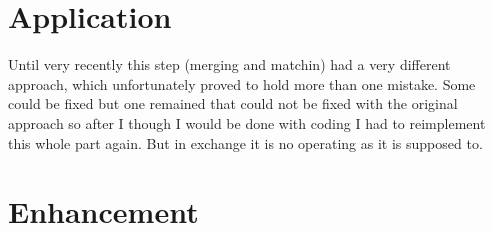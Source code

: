 \section{Application}
Until very recently this step (merging and matchin) had a very different approach, which unfortunately proved to hold more than one mistake. Some could be fixed but one remained that could not be fixed with the original approach so after I though I would be done with coding I had to reimplement this whole part again. But in exchange it is no operating as it is supposed to.

\section{Enhancement}
